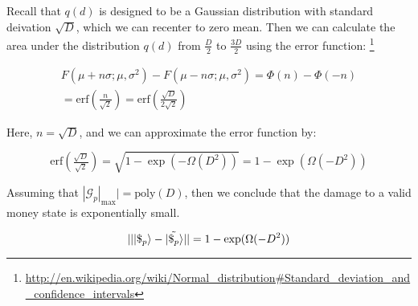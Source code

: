 Recall that $q(d)$ is designed to be a Gaussian distribution with
standard deivation $\sqrt{D}$, which we can recenter to zero mean.
Then we
can calculate the area under the distribution $q(d)$ from
$\frac{D}{2}$ to $\frac{3D}{2}$ using the error function:
\footnote{\url{http://en.wikipedia.org/wiki/Normal\_distribution\#Standard\_deviation\_and\_confidence\_intervals}}

\begin{multline*}
F(\mu + n\sigma; \mu, \sigma^2) - F(\mu - n\sigma; \mu, \sigma^2) = 
\Phi(n) - \Phi(-n) \\ = \textrm{erf}(\tfrac{n}{\sqrt{2}}) =
\textrm{erf}(\tfrac{\sqrt{D}}{2\sqrt{2}})
\end{multline*}

Here, $n = \sqrt{D}$, and we can approximate the
error function by:

\begin{displaymath}
\textrm{erf}(\tfrac{\sqrt{D}}{\sqrt{2}}) =
\sqrt{1 - \exp(-\Omega(D^2))} = 1 - \exp(\Omega(-D^2))
\end{displaymath}

Assuming that $|\mathcal{G}_p|_{\textrm{max}}| = \textrm{poly}(D)$,
then we conclude that the damage to a valid money state is exponentially
small.

\begin{displaymath}
|| |\$_p \rangle - |\tilde{\$_p} \rangle || = 1 - \exp(\Omega(-D^2))
\end{displaymath}

